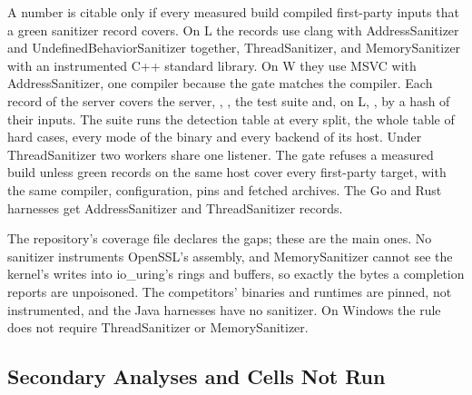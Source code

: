 A number is citable only if every measured build compiled first-party inputs that a green
sanitizer record covers. On L the records use clang \ClangVersion{} with AddressSanitizer and
UndefinedBehaviorSanitizer together, ThreadSanitizer, and MemorySanitizer with an instrumented C++
standard library. On W they use MSVC \MsvcVersion{} with AddressSanitizer, one compiler because the
gate matches the compiler. Each record of the server covers the server, \opgen, \opcase, the test
suite and, on L, \ophold{}, by a hash of their inputs. The suite runs the detection table at every split, the whole table
of hard cases, every mode of the binary and every backend of its host. Under ThreadSanitizer two
workers share one listener. The gate refuses a measured build unless green records on the same host
cover every first-party target, with the same compiler, configuration, pins and fetched archives.
The Go and Rust harnesses get AddressSanitizer and ThreadSanitizer records.

The repository's coverage file declares the gaps; these are the main ones. No sanitizer instruments
OpenSSL's assembly, and
MemorySanitizer cannot see the kernel's writes into io\_uring's rings and buffers, so exactly the
bytes a completion reports are unpoisoned. The competitors' binaries and runtimes are pinned, not
instrumented, and the Java harnesses have no sanitizer. On Windows the rule does not require
ThreadSanitizer or MemorySanitizer.

\subsection{Secondary Analyses and Cells Not Run}\label{sec:secondary}

